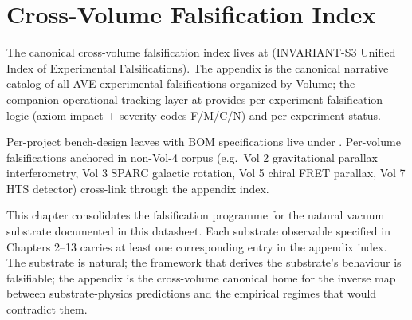 \section{Cross-Volume Falsification Index}
\label{sec:vol9_cross_volume_index}

The canonical cross-volume falsification index lives at  (INVARIANT-S3 Unified Index of Experimental Falsifications). The appendix is the canonical narrative catalog of all AVE experimental falsifications organized by Volume; the companion operational tracking layer at  provides per-experiment falsification logic (axiom impact + severity codes F/M/C/N) and per-experiment status.

Per-project bench-design leaves with BOM specifications live under . Per-volume falsifications anchored in non-Vol-4 corpus (e.g.\ Vol 2 gravitational parallax interferometry, Vol 3 SPARC galactic rotation, Vol 5 chiral FRET parallax, Vol 7 HTS detector) cross-link through the appendix index.

This chapter consolidates the falsification programme for the natural vacuum substrate documented in this datasheet. Each substrate observable specified in Chapters 2--13 carries at least one corresponding entry in the appendix index. The substrate is natural; the framework that derives the substrate's behaviour is falsifiable; the appendix is the cross-volume canonical home for the inverse map between substrate-physics predictions and the empirical regimes that would contradict them.
